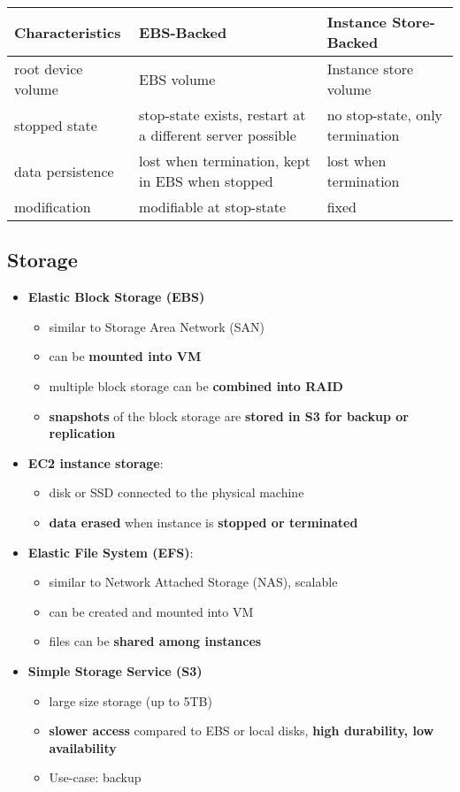 \begin{table}[H]
	\begin{center}
	\begin{tabular}{|l|p{5cm}|p{5cm}|}
		\hline
		Characteristics  &EBS-Backed  & Instance Store-Backed \\ \hline
		root device volume        &EBS volume  & Instance store volume   \\ \hline
		stopped state     & stop-state exists, restart at a different server possible  & no stop-state, only termination    \\ \hline
		data persistence       & lost when termination, kept in EBS when stopped  & lost when termination   \\ \hline
		modification  & modifiable at stop-state  & fixed    \\ \hline
	\end{tabular}
\end{center}
\end{table}

\subsection{Storage}
\begin{itemize}
	\item \textbf{Elastic Block Storage (EBS)}
	\begin{itemize}
		\item similar to Storage Area Network (SAN)
		\item can be \textbf{mounted into VM}
		\item multiple block storage can be \textbf{combined into RAID}
		\item \textbf{snapshots} of the block storage are \textbf{stored in S3 for backup or replication}
	\end{itemize}
	\item \textbf{EC2 instance storage}: 
	\begin{itemize}
		\item disk or SSD connected to the physical machine
		\item \textbf{data erased} when instance is \textbf{stopped or terminated}
	\end{itemize}
	\item \textbf{Elastic File System (EFS)}: 
	\begin{itemize}
		\item similar to Network Attached Storage (NAS), scalable
		\item can be created and mounted into VM
		\item files can be \textbf{shared among instances}
	\end{itemize}
	\item \textbf{Simple Storage Service (S3)}
	\begin{itemize}
		\item large size storage (up to 5TB)
		\item \textbf{slower access} compared to EBS or local disks, \textbf{high durability, low availability}
		\item Use-case: backup
	\end{itemize}
\end{itemize}

